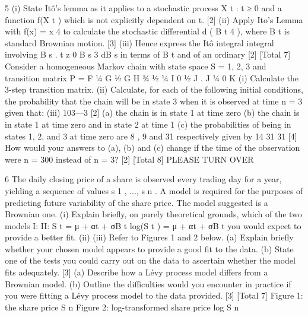 \documentclass[a4paper,12pt]{article}
\begin{document}
\begin{enumerate}
5
(i) State Itô’s lemma as it applies to a stochastic process {X t : t ≥ 0} and a
function f(X t ) which is not explicitly dependent on t.
[2]
(ii) Apply Ito’s Lemma with f(x) = x 4 to calculate the stochastic differential
d ( B t 4 ), where B t is standard Brownian motion.
[3]
(iii) Hence express the Itô integral
integral involving B s .
t
z 0
B s 3 dB s in terms of B t and of an ordinary
[2]
[Total 7]
Consider a homogeneous Markov chain with state space S = {1, 2, 3} and
transition matrix
P =
F 1⁄4
G 1⁄2
G
H 3⁄4
1⁄2 1⁄4 I
0 1⁄2 J .
J
1⁄4 0 K
(i) Calculate the 3-step transition matrix.
(ii) Calculate, for each of the following initial conditions, the probability that
the chain will be in state 3 when it is observed at time n = 3 given that:
(iii)
103—3
[2]
(a) the chain is in state 1 at time zero
(b) the chain is in state 1 at time zero and in state 2 at time 1
(c) the probabilities of being in states 1, 2, and 3 at time zero are
8
, 9 and 31
respectively
given by 14
31 31
[4]
How would your answers to (a), (b) and (c) change if the time of the
observation were n = 300 instead of n = 3?
[2]
[Total 8]
PLEASE TURN OVER

6
The daily closing price of a share is observed every trading day for a year,
yielding a sequence of values {s 1 , ..., s n }. A model is required for the purposes of
predicting future variability of the share price. The model suggested is a
Brownian one.
(i)
Explain briefly, on purely theoretical grounds, which of the two models
I:
II:
S t = μ + αt + σB t
log(S t ) = μ + αt + σB t
you would expect to provide a better fit.
(ii)
(iii)
Refer to Figures 1 and 2 below.
(a) Explain briefly whether your chosen model appears to provide a
good fit to the data.
(b) State one of the tests you could carry out on the data to ascertain
whether the model fits adequately.
[3]
(a) Describe how a Lévy process model differs from a Brownian model.
(b) Outline the difficulties would you encounter in practice if you were
fitting a Lévy process model to the data provided.
[3]
[Total 7]
Figure 1: the share price S n
Figure 2: log-transformed share price log S n


\end{enumerate}
\end{document}
